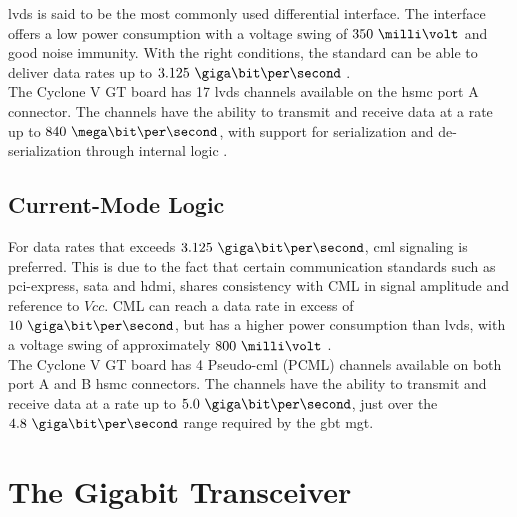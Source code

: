 \documentclass[main.tex]{subfiles}
\begin{document}
\gls{lvds} is said to be the most commonly used differential interface. The interface offers a low power consumption with a voltage swing of $350\ \milli\volt$ and good noise immunity. With the right conditions, the standard can be able to deliver data rates up to $3.125\ \giga\bit\per\second$ \cite{ti08lvds}.\\

The Cyclone V GT board has 17 \gls{lvds} channels available on the \gls{hsmc} port A connector. The channels have the ability to transmit and receive data at a rate up to $840\ \mega\bit\per\second$, with support for serialization and de-serialization through internal logic \cite{altera_cvoverview15}.

\section{Current-Mode Logic}

For data rates that exceeds $3.125\ \giga\bit\per\second$, \gls{cml} signaling is preferred. This is due to the fact that certain communication standards such as \acrshort{pci}-express, \acrshort{sata} and \acrshort{hdmi}, shares consistency with CML in signal amplitude and reference to $Vcc$. CML can reach a data rate in excess of $10\ \giga\bit\per\second$, but has a higher power consumption than \gls{lvds}, with a voltage swing of approximately $800\ \milli\volt$ \cite{ti08lvds}.\\

The Cyclone V GT board has 4 Pseudo-\gls{cml} (PCML) channels available on both port A and B \gls{hsmc} connectors. The channels have the ability to transmit and receive data at a rate up to $5.0\ \giga\bit\per\second$, just over the $4.8\ \giga\bit\per\second$ range required by the \gls{gbt} \gls{mgt}. \cite{altera_cyclonekit}






\chapter{The Gigabit Transceiver} \label{chap:gbt}
\end{document}
